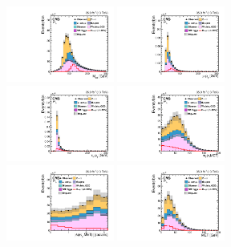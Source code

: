 \begin{figure}[htpb]\centering
 \includegraphics[width=0.315\textwidth]{chapter5/BDTvariable/LFV_preselection_collMass_type1_Fakes_PoissonErrors.pdf}
 \includegraphics[width=0.315\textwidth]{chapter5/BDTvariable/LFV_preselection_mPt_Fakes_PoissonErrors.pdf} \\
 \includegraphics[width=0.315\textwidth]{chapter5/BDTvariable/LFV_preselection_tPt_Fakes_PoissonErrors.pdf}
 \includegraphics[width=0.315\textwidth]{chapter5/BDTvariable/LFV_preselection_tMtToPfMet_type1_Fakes_PoissonErrors.pdf}  \\
 \includegraphics[width=0.315\textwidth]{chapter5/BDTvariable/LFV_preselection_tDPhiToPfMet_type1_Fakes_PoissonErrors.pdf}
 \includegraphics[width=0.315\textwidth]{chapter5/BDTvariable/LFV_preselection_type1_pfMetEt_Fakes_PoissonErrors.pdf} \\

\end{figure}
